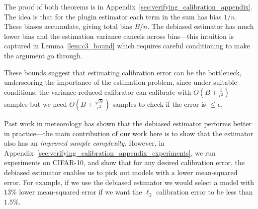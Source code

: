 The proof of both theorems is in Appendix~\ref{sec:verifying_calibration_appendix}. The idea is that for the plugin estimator each term in the sum has bias $1/n$. These biases accumulate, giving total bias $B/n$. The debiased estimator has much lower bias and the estimation variance cancels across bins---this intuition is captured in Lemma~\ref{lem:c3_bound} which requires careful conditioning to make the argument go through.

These bounds suggest that estimating calibration error can be the bottleneck, underscoring the importance of the estimation problem, since under suitable conditions, the variance-reduced calibrator can calibrate with $\widetilde{O}(B + \frac{1}{\epsilon^2})$ samples but we need $\widetilde{O}(B + \frac{\sqrt{B}}{\epsilon^2})$ samples to check if the error is $\leq \epsilon$.

Past work in meteorology has shown that the debiased estimator performs better in practice---the main contribution of our work here is to show that the estimator also has an \emph{improved sample complexity}. However, in Appendix~\ref{sec:verifying_calibration_appendix_experiments}, we run experiments on CIFAR-10, and show that for any desired calibration error, the debiased estimator enables us to pick out models with a lower mean-squared error. For example, if we use the debiased estimator we would select a model with $13\%$ lower mean-squared error if we want the $\ell_2$ calibration error to be less than $1.5\%$.




